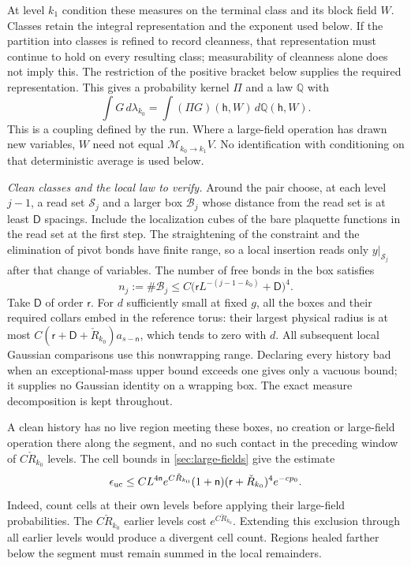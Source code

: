 \documentclass[11pt,letterpaper,reqno]{amsart}
\theoremstyle{definition}
\theoremstyle{remark}
\begin{document}
At level $k_1$ condition these measures on the terminal class and its
block field $W$. Classes retain the integral representation and
the exponent used below. If the partition into classes is
refined to record cleanness, that representation must continue
to hold on every resulting class; measurability of cleanness
alone does not imply this. The restriction of the positive
bracket below supplies the required representation.
This gives a probability kernel $\Pi$ and a law
$\mathbb Q$ with
\begin{equation}\label{eq:inserted-run-coupling}
 \int G\,d\lambda_{k_0}
       =\int (\Pi G)(\mathsf h,W)\,d\mathbb Q(\mathsf h,W).
\end{equation}
This is a coupling defined by the run. Where a large-field operation
has drawn new variables, $W$ need not equal
$\mathcal M_{k_0\to k_1}V$. No identification with conditioning on
that deterministic average is used below.

\emph{Clean classes and the local law to verify.}
Around the pair choose, at each level $j-1$, a read set
$\mathcal S_j$ and a larger box $\mathcal B_j$ whose distance from
the read set is at least $\mathsf D$ spacings. Include the localization
cubes of the bare plaquette functions in the read set at the first
step. The straightening of the constraint and the elimination of pivot
bonds have finite range, so a local insertion reads only
$y|_{\mathcal S_j}$ after that change of variables. The number of free
bonds in the box satisfies
\begin{equation}\label{eq:inserted-box-count}
 n_j:=\#\mathcal B_j
       \le C\big(\mathsf rL^{-(j-1-k_0)}+\mathsf D\big)^4.
\end{equation}
Take $\mathsf D$ of order $\mathsf r$. For $d$ sufficiently small at
fixed $g$, all the boxes and their required collars embed in the
reference torus: their largest physical radius is at most
$C(\mathsf r+\mathsf D+\check R_{k_0})a_{s-\mathsf n}$, which tends
to zero with $d$. All subsequent local Gaussian comparisons
use this nonwrapping range. Declaring every history bad when
an exceptional-mass upper bound exceeds one gives only a
vacuous bound; it supplies no Gaussian identity on a wrapping
box. The exact measure decomposition is kept throughout.

A clean history has no live region meeting these boxes, no creation or
large-field operation there along the segment, and no such contact in
the preceding window of $C\check R_{k_0}$ levels. The cell bounds in
\cref{sec:large-fields} give the estimate
\begin{equation}\label{eq:inserted-unclean-weight}
 \epsilon_{\rm uc}\le
 C L^{4\mathsf n}e^{C\check R_{k_0}}(1+\mathsf n)
    (\mathsf r+\check R_{k_0})^4e^{-cp_0}.
\end{equation}
Indeed, count cells at their own levels before applying their
large-field probabilities. The $C\check R_{k_0}$ earlier levels cost
$e^{C\check R_{k_0}}$. Extending this exclusion through all earlier
levels would produce a divergent cell count. Regions healed farther
below the segment must remain summed in the local remainders.
\end{document}
